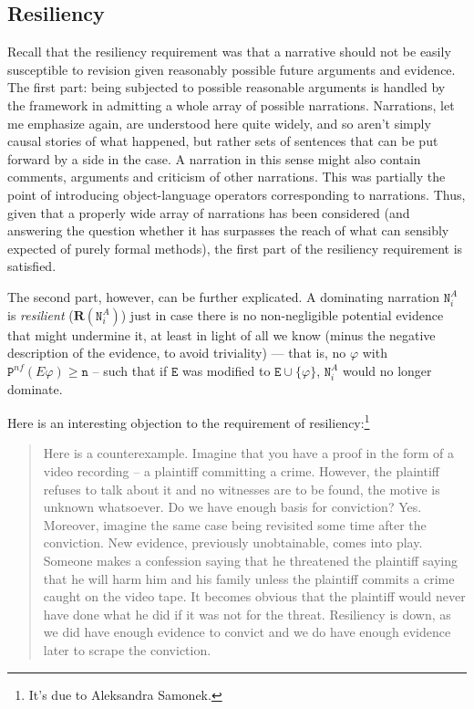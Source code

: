 \documentclass[10pt,leqno]{article}
\begin{document}
\subsection{Resiliency} \label{sec:resiliency_formal}

Recall that the resiliency requirement was that a narrative should not be easily susceptible to revision given reasonably possible future arguments and evidence.  The first part: being subjected to possible reasonable arguments is handled by the framework in admitting a whole array of possible narrations. Narrations, let me emphasize again, are understood here quite widely, and so aren't simply causal stories of what happened, but rather sets of sentences that can be put forward by a side in the case. A narration in this sense might also contain comments, arguments and criticism of other narrations. This was partially the point of introducing object-language operators corresponding to narrations. Thus, given that a properly wide array of narrations has been considered (and answering the question whether it has surpasses the reach of what can sensibly expected of purely formal methods), the first part of the resiliency requirement is satisfied. 

  The second part, however, can be further explicated.  A dominating narration $\mathtt{N}^A_i$ is \emph{resilient} ($\mathbf{R}(\mathtt{N}^A_i)$) just in case there is no non-negligible potential evidence that might undermine it, at least in  light of all we know (minus the negative description of the evidence, to avoid triviality)  ---  that is, no $\varphi$ with $\mathtt{P}^{nf}(E\varphi)\geq \mathtt{n}$ -- such that if $\mathtt{E}$ was modified to $\mathtt{E}\cup\{\varphi\}$, $\mathtt{N}^A_i$ would no longer dominate.
    
  

  Here is an interesting objection to the requirement of resiliency:\footnote{It's due to Aleksandra Samonek.}
  \begin{quote}
Here is a counterexample. Imagine that you have a proof in the form of a video recording -- a plaintiff committing a crime. However, the plaintiff refuses to talk about it and no witnesses are to be found, the motive is unknown whatsoever. Do we have enough basis for conviction? Yes. Moreover, imagine the same case being revisited some time after the conviction. New evidence, previously unobtainable, comes into play. Someone makes a confession saying that he threatened the plaintiff saying that he will harm him and his family unless the plaintiff commits a crime caught on the video tape. It becomes obvious that the plaintiff would never have done what he did if it was not for the threat. Resiliency is down, as we did have enough evidence to convict and we do have enough evidence later to scrape the conviction.
  \end{quote}
\end{document}
